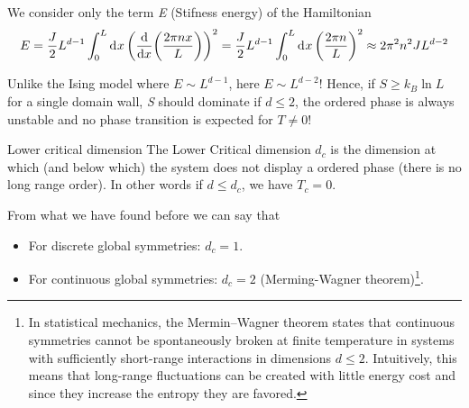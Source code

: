\documentclass[../main/main.tex]{subfiles}
\begin{document}
We consider only the term \emph{E} (Stifness energy) of the Hamiltonian 
 \begin{equation}
   E = \frac{J}{2} L^{d-1} \int_{0}^{L} \dd[]{x} \qty(\dv{}{x} \qty(\frac{2 \pi n x}{L})  )^2 = \frac{J}{2} L^{d-1} \int_{0}^{L} \dd[]{x} \qty(\frac{2 \pi n}{L})^2 \approx 2 \pi ^2 n^2 J L^{d-2}
 \end{equation}
\begin{remark}
Unlike the Ising model where \( E \sim L^{d-1} \), here \( E \sim L^{d-2} \)! Hence, if \( S \ge k_B \ln{L}  \) for a single domain wall, \emph{S} should dominate if \( d \le 2 \), the ordered phase is always unstable and no phase transition is expected for \( T \neq 0 \)!
\end{remark}

\begin{definition}{Lower critical dimension}{}
  The Lower Critical dimension \( d_c \) is the dimension at which (and below which) the system does not display a ordered phase (there is no long range order).
  In other words if \( d \le d_c \), we have \( T_c = 0 \).
\end{definition}
 From what we have found before we can say that
\begin{itemize}
\item For discrete global symmetries: \( d_c =1 \).
\item For continuous global symmetries: \( d_c =2 \) (Merming-Wagner theorem)\footnote{In statistical mechanics, the Mermin–Wagner theorem states that continuous symmetries cannot be spontaneously broken at finite temperature in systems with sufficiently short-range interactions in dimensions \(d \le 2\). Intuitively, this means that long-range fluctuations can be created with little energy cost and since they increase the entropy they are favored.}.
\end{itemize}
\end{document}
